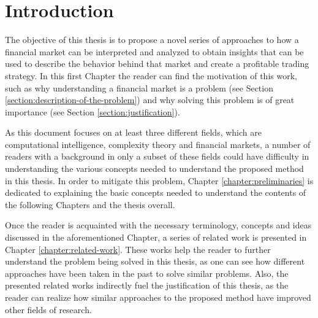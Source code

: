 \chapter{Introduction}
\label{chapter:introduction}


The objective of this thesis is to propose a novel series of approaches to how a
financial market can be interpreted and analyzed to obtain insights that can be
used to describe the behavior behind that market and create a profitable trading
strategy. In this first Chapter the reader can find the motivation of this work,
such as why understanding a financial market is a problem (see Section
\ref{section:description-of-the-problem}) and why solving this problem is of
great importance (see Section \ref{section:justification}).






As this document focuses on at least three different fields, which are
computational intelligence, complexity theory and financial markets, a number of
readers with a background in only a subset of these fields could have difficulty
in understanding the various concepts needed to understand the proposed method
in this thesis. In order to mitigate this problem, Chapter
\ref{chapter:preliminaries} is dedicated to explaining the basic concepts needed
to understand the contents of the following Chapters and the thesis overall.



Once the reader is acquainted with the necessary terminology, concepts and ideas
discussed in the aforementioned Chapter, a series of related work is presented
in Chapter \ref{chapter:related-work}. These works help the reader to further
understand the problem being solved in this thesis, as one can see how different
approaches have been taken in the past to solve similar problems. Also, the
presented related works indirectly fuel the justification of this thesis, as the
reader can realize how similar approaches to the proposed method have improved
other fields of research.

